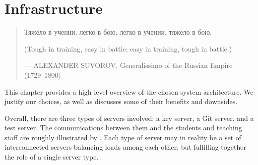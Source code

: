 
\chapter{Infrastructure}

\label{section:infrastructure}

\begin{quotation}

\footnotesize\sffamily\itshape

\begin{flushright}


Тяжело в учении, легко в бою; легко в учении, тяжело в бою.


\smallbreak

(Tough in training, easy in battle; easy in training, tough in battle.)

\smallbreak

\upshape

--- ALEXANDER SUVOROV, Generalissimo of the Russian Empire (1729--1800)

\end{flushright}

\end{quotation}

This chapter provides a high level overview of the chosen system architecture.
We justify our choices, as well as discusses some of their benefits and
downsides.

Overall, there are three types of servers involved: a key server, a Git server,
and a test server. The communications between them and the students and
teaching staff are roughly illustrated by . Each
type of server may in reality be a set of interconnected servers balancing
loads among each other, but fulfilling together the role of a single server
type.











